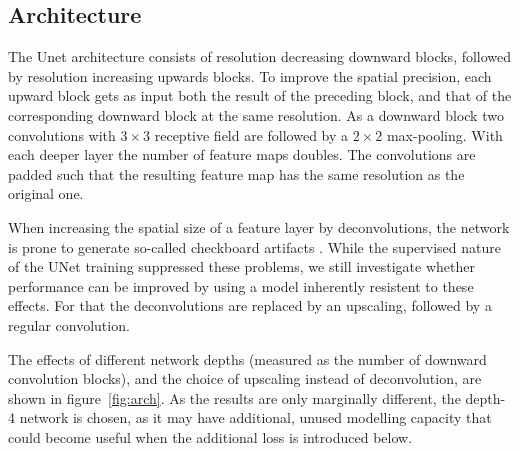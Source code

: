 \documentclass[aps,prl,twocolumn,groupedaddress,amsmath,amssymb]{revtex4-1}
\begin{document}
    \subsection{Architecture}
    The Unet architecture consists of resolution decreasing downward blocks, followed by resolution
    increasing upwards blocks. To improve the spatial precision, each upward block gets  as input
    both the result of the preceding block, and that of the corresponding downward block at the same
    resolution. As a downward block two convolutions with $3\times3$ receptive field are followed by
    a $2\times2$ max-pooling. With each deeper layer the  number of feature maps doubles. The
    convolutions are padded such that the resulting feature map has the same resolution as the
    original one.

    When increasing the spatial size of a feature layer by deconvolutions, the network is
    prone to generate so-called checkboard artifacts \cite{odena2016deconvolution}. While the 
    supervised nature of the UNet training suppressed these problems, we still investigate whether
    performance can be improved by using a model inherently resistent to these effects. For that
    the deconvolutions are replaced by an upscaling, followed by a regular convolution. 

    The effects of different network depths (measured as the number of downward convolution blocks),
    and the choice of upscaling instead of deconvolution, are shown in figure~\ref{fig:arch}. As the
    results are only marginally different, the depth-4 network is chosen, as it may have additional,
    unused modelling capacity that could become useful when the additional loss is introduced below.
\end{document}
